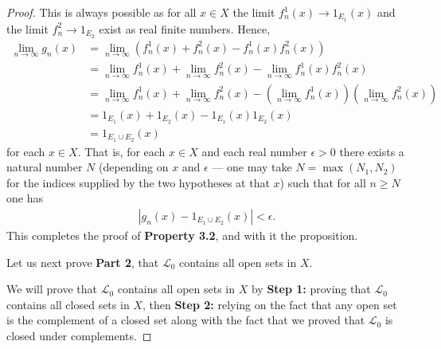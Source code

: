 \begin{proof}
This is always possible as for all $x \in X$ the limit $f^1_n(x) \rightarrow 1_{E_1}(x)$ and the limit $f^2_n \rightarrow 1_{E_2}$ exist as real finite numbers. Hence,
\begin{align}
    \lim_{n \rightarrow \infty} g_n(x) &= \lim_{n \rightarrow \infty} \left( f^1_n(x) + f^2_n(x) - f^1_n(x) f^2_n(x) \right) \\ 
                                       &= \lim_{n \rightarrow \infty} f^1_n(x) + \lim_{n \rightarrow \infty} f^2_n(x) - \lim_{n \rightarrow \infty} f^1_n(x) f^2_n(x) \\ 
                                       &= \lim_{n \rightarrow \infty} f^1_n(x) + \lim_{n \rightarrow \infty} f^2_n(x) - \left( \lim_{n \rightarrow \infty} f^1_n(x) \right) \left( \lim_{n \rightarrow \infty} f^2_n(x) \right) \\ 
                                       &= 1_{E_1}(x) + 1_{E_2}(x) - 1_{E_1}(x) 1_{E_2}(x) \\
                                       &= 1_{E_1 \cup E_2}(x)
\end{align}
for each $x \in X$. That is, for each $x \in X$ and each real number $\epsilon > 0$ there exists a natural number $N$ (depending on $x$ and $\epsilon$ — one may take $N = \max(N_1,N_2)$ for the indices supplied by the two hypotheses at that $x$) such that for all $n \ge N$ one has
\begin{align}
    \left\lvert g_n(x) - 1_{E_1 \cup E_2}(x) \right\rvert < \epsilon.
\end{align}
This completes the proof of \textbf{Property 3.2}, and with it the proposition.

Let us next prove \textbf{Part 2}, that $\mathcal{L}_0$ contains all open sets in $X$.

We will prove that $\mathcal{L}_0$ contains all open sets in $X$ by \textbf{Step 1:} proving that $\mathcal{L}_0$ contains all closed sets in $X$, then \textbf{Step 2:} relying on the fact that any open set is the complement of a closed set along with the fact that we proved that $\mathcal{L}_0$ is closed under complements.
\end{proof}

